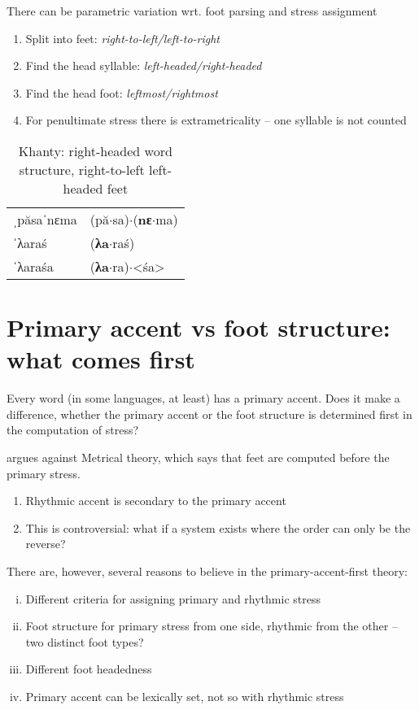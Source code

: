 \documentclass[a4paper, 12pt]{article}
\begin{document}
	There can be parametric variation wrt. foot parsing and stress assignment \parencite{hayes1980}
	
	\begin{enumerate}[$\gg$]
		\item Split into feet: \emph{right-to-left/left-to-right}
		\item Find the head syllable: \emph{left-headed/right-headed}
		\item Find the head foot: \emph{leftmost/rightmost}
		\item For penultimate stress there is extrametricality -- one syllable is not counted
	\end{enumerate}
		
\begin{table}[]
\centering
\begin{tabular}{ll}
ˌpăsaˈnɛma &  (pă$\cdot$sa)$\cdot$(\textbf{nɛ}$\cdot$ma)\\
ˈλaraś     &  (\textbf{λa}$\cdot$raś)\\
ˈλaraśa    &  (\textbf{λa}$\cdot$ra)$\cdot$<śa>
\end{tabular}
\caption*{Khanty: right-headed word structure, right-to-left left-headed feet}
\end{table}
				
		\section{Primary accent vs foot structure: what comes first}
		
	Every word (in some languages, at least) has a primary accent. Does it make a difference, whether the primary accent or the foot structure is determined first in the computation of stress? 
	
	\textcite{vanderhulst2009} argues against Metrical theory, which says that feet are computed before the primary stress.
	
	\begin{enumerate}[$\gg$]
		\item Rhythmic accent is secondary to the primary accent
		\item This is controversial: what if a system exists where the order can only be the reverse?
	\end{enumerate}
	
	There are, however, several reasons to believe in the primary-accent-first theory:
	
	\begin{enumerate}[i.]
		\item Different criteria for assigning primary and rhythmic stress
		\item Foot structure for primary stress from one side, rhythmic from the other -- two distinct foot types?
		\item Different foot headedness
		\item Primary accent can be lexically set, not so with rhythmic stress \hfill \parencite{vanderhulst2009}
	\end{enumerate}
	
\end{document}
